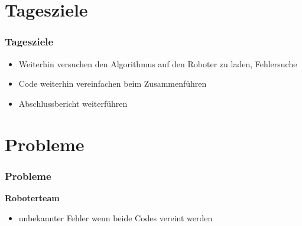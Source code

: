 \documentclass[ddcfooter,nototalpage]{tudbeamer}
\begin{document}
\section{Tagesziele}
\begin{frame}
\frametitle{Tagesziele}
\normalsize

\begin{itemize}
\item Weiterhin versuchen den Algorithmus auf den Roboter zu laden, Fehlersuche
\item Code weiterhin vereinfachen beim Zusammenführen
\item Abschlussbericht weiterführen
\end{itemize}
\end{frame}

\section{Probleme}
\begin{frame}
\frametitle{Probleme}
\normalsize

\textbf{Roboterteam}
\begin{itemize}
\item unbekannter Fehler wenn beide Codes vereint werden
\end{itemize}
\end{frame}
\end{document}
